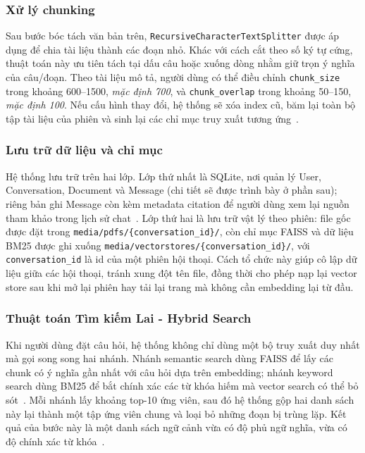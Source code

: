 \documentclass[10pt, conference, a4paper, compsocconf]{IEEEtran}
\begin{document}
\subsubsection{Xử lý chunking}
Sau bước bóc tách văn bản trên, \texttt{RecursiveCharacterTextSplitter} được áp dụng để chia tài liệu thành các đoạn nhỏ. Khác với cách cắt theo số ký tự cứng, thuật toán này ưu tiên tách tại dấu câu hoặc xuống dòng nhằm giữ trọn ý nghĩa của câu/đoạn. Theo tài liệu mô tả, người dùng có thể điều chỉnh \texttt{chunk\_size} trong khoảng 600--1500, \textit{mặc định 700}, và \texttt{chunk\_overlap} trong khoảng 50--150, \textit{mặc định 100}. Nếu cấu hình thay đổi, hệ thống sẽ xóa index cũ, băm lại toàn bộ tập tài liệu của phiên và sinh lại các chỉ mục truy xuất tương ứng~\cite{smartdoc-source}.

\subsubsection{Lưu trữ dữ liệu và chỉ mục}
Hệ thống lưu trữ trên hai lớp. Lớp thứ nhất là SQLite, nơi quản lý User, Conversation, Document và Message (chi tiết sẽ được trình bày ở phần sau); riêng bản ghi Message còn kèm metadata citation để người dùng xem lại nguồn tham khảo trong lịch sử chat~\cite{smartdoc-source}. Lớp thứ hai là lưu trữ vật lý theo phiên: file gốc được đặt trong \texttt{media/pdfs/\{conversation\_id\}/}, còn chỉ mục FAISS và dữ liệu BM25 được ghi xuống \texttt{media/vectorstores/\{conversation\_id\}/}, với \texttt{conversation\_id} là id của một phiên hội thoại. Cách tổ chức này giúp cô lập dữ liệu giữa các hội thoại, tránh xung đột tên file, đồng thời cho phép nạp lại vector store sau khi mở lại phiên hay tải lại trang mà không cần embedding lại từ đầu.

\subsubsection{Thuật toán Tìm kiếm Lai - Hybrid Search}
Khi người dùng đặt câu hỏi, hệ thống không chỉ dùng một bộ truy xuất duy nhất mà gọi song song hai nhánh. Nhánh semantic search dùng FAISS để lấy các chunk có ý nghĩa gần nhất với câu hỏi dựa trên embedding; nhánh keyword search dùng BM25 để bắt chính xác các từ khóa hiếm mà vector search có thể bỏ sót~\cite{faiss,bm25}. Mỗi nhánh lấy khoảng top-10 ứng viên, sau đó hệ thống gộp hai danh sách này lại thành một tập ứng viên chung và loại bỏ những đoạn bị trùng lặp. Kết quả của bước này là một danh sách ngữ cảnh vừa có độ phủ ngữ nghĩa, vừa có độ chính xác từ khóa~\cite{smartdoc-source}.
\end{document}
